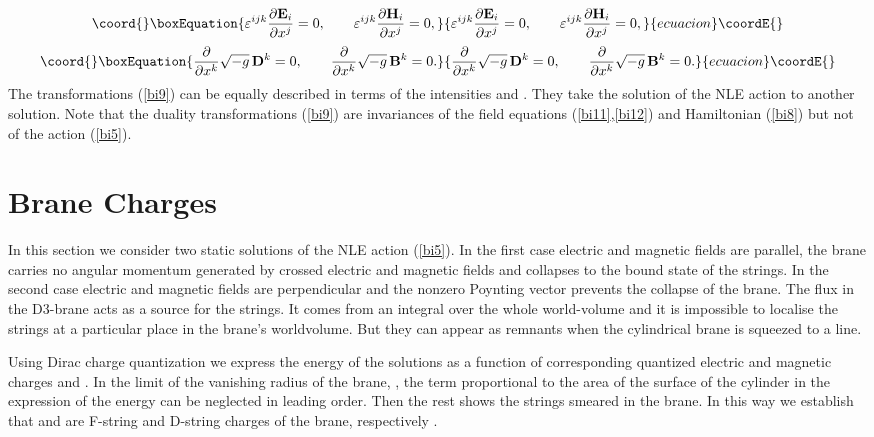 \documentclass[a4paper,12pt]{article}
\begin{document}
\begin{equation}\coord{}\boxEquation{
{\varepsilon}^{ijk}\frac{\partial {\e}_i}{\partial x^j}=0,\qquad 
{\varepsilon}^{ijk}\frac{\partial {\h}_i}{\partial x^j}=0,
\label{bi11}
}{
{\varepsilon}^{ijk}\frac{\partial {\e}_i}{\partial x^j}=0,\qquad 
{\varepsilon}^{ijk}\frac{\partial {\h}_i}{\partial x^j}=0,
}{ecuacion}\coordE{}\end{equation}
\begin{equation}\coord{}\boxEquation{
\frac{\partial }{\partial x^k}\sqrt{-g}\,{\d}^k=0,\qquad 
\frac{\partial }{\partial x^k}\sqrt{-g}\,{\m}^k=0.
\label{bi12}
}{
\frac{\partial }{\partial x^k}\sqrt{-g}\,{\d}^k=0,\qquad 
\frac{\partial }{\partial x^k}\sqrt{-g}\,{\m}^k=0.
}{ecuacion}\coordE{}\end{equation}
The transformations (\ref{bi9}) can be equally described in terms of the 
intensities \myHighlight{$\e$}\coordHE{} and \myHighlight{$\h$}\coordHE{}. They take the solution of the NLE action to
another solution. Note that the duality transformations (\ref{bi9}) are 
invariances of the field equations (\ref{bi11},\ref{bi12}) and Hamiltonian 
(\ref{bi8}) but not of the action (\ref{bi5}).

\section{Brane Charges}

\noindent

In this section we consider two static solutions of the NLE action 
(\ref{bi5}). In the first case electric and magnetic fields are parallel, 
the brane carries no angular momentum generated by crossed electric and 
magnetic fields and collapses to the bound state of the strings. In the second 
case electric and magnetic fields are perpendicular and the nonzero Poynting 
vector prevents the collapse of the brane. The flux in the D3-brane acts as 
a source for the strings. It comes 
from an integral over the whole world-volume and it is impossible to localise
the strings at a particular place in the brane's worldvolume. But they can 
appear as remnants when the cylindrical brane is squeezed to a line.

\noindent

Using Dirac charge quantization we express the 
energy of the solutions as a function of corresponding quantized electric and 
magnetic charges \coordHE{} and \coordHE{}. In the limit of the vanishing radius \coordHE{} 
of the brane, \coordHE{}, the term proportional to the area of the 
surface of the cylinder \coordHE{} in the expression of the energy  
can be neglected in leading order. Then the rest shows the strings smeared in 
the brane. In this way we establish that \coordHE{} and \coordHE{} are F-string and 
D-string charges of the brane, respectively .
\end{document}
